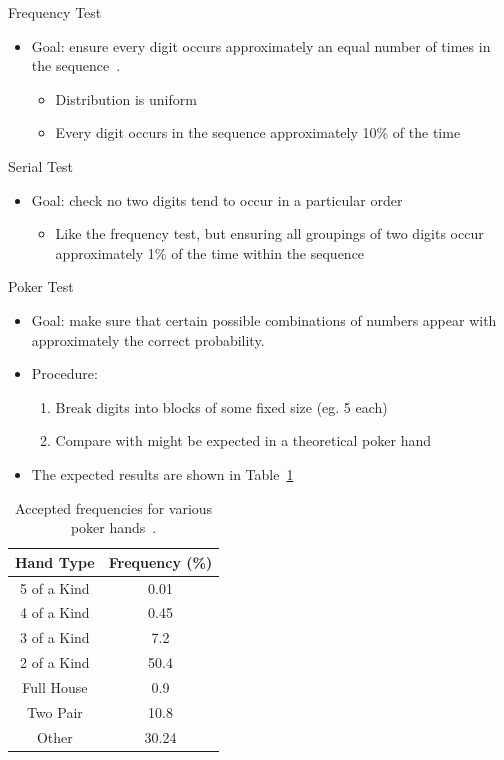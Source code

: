 \documentclass{beamer} %
\begin{document}
\begin{frame}{Frequency Test}
\begin{itemize}
\item Goal: ensure every digit occurs approximately an equal number of times in the sequence~\cite{odell,gruenberger,drueke}.  
\begin{itemize}
\item Distribution is uniform
\item Every digit occurs in the sequence approximately 10\% of the time
\end{itemize}
\end{itemize}
\end{frame}

\begin{frame}{Serial Test}
\begin{itemize}
\item Goal: check no two digits tend to occur in a particular order~\cite{odell,gruenberger,drueke}
\begin{itemize}
\item Like the frequency test, but ensuring all groupings of two digits occur approximately 1\% of the time within the sequence
\end{itemize}
\end{itemize}
\end{frame}

\begin{frame}{Poker Test}
\begin{itemize}
\item Goal: make sure that certain possible combinations of numbers appear with approximately the correct probability.
\item Procedure:
\begin{enumerate}
\item Break digits into blocks of some fixed size (eg. 5 each) 
\item Compare with might be expected in a theoretical poker hand
\end{enumerate}
\item The expected results are shown in Table~\ref{tab:pokeracc}~\cite{drueke} 
\end{itemize}
\begin{table}[ht]
\begin{center}
\begin{tabular}{c|c} \hline
	Hand Type & Frequency (\%) \\ \hline
    5 of a Kind & 0.01\\
    4 of a Kind & 0.45\\
    3 of a Kind & 7.2\\
    2 of a Kind & 50.4\\
    Full House & 0.9\\
    Two Pair & 10.8\\ 
    Other & 30.24\\ \hline
\end{tabular}
\caption{Accepted frequencies for various poker hands~\cite{babington}.}
\label{tab:pokeracc}
\end{center}
\end{table}
\end{frame}
\end{document}
